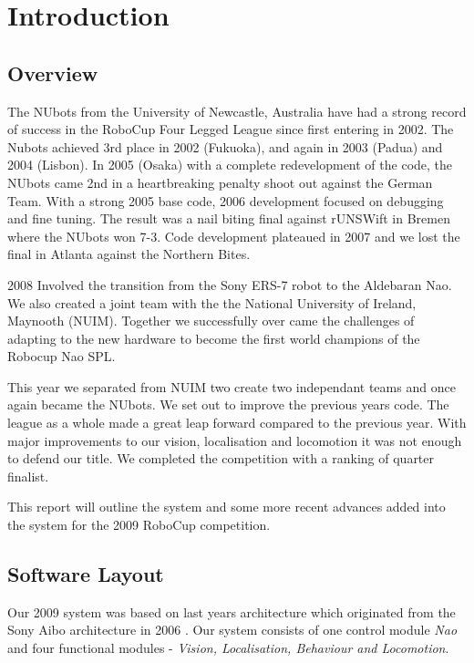 \section{Introduction}

\subsection{Overview}

The NUbots from the University of Newcastle, Australia have had a strong record of success in the RoboCup Four Legged League since first entering in 2002. The Nubots achieved 3rd place in 2002 (Fukuoka), and again in 2003 (Padua) and 2004 (Lisbon). In 2005 (Osaka) with a complete redevelopment of the code, the NUbots came 2nd in a heartbreaking penalty shoot out against the German Team. With a strong 2005 base code, 2006 development focused on debugging and fine tuning. The result was a nail biting final against rUNSWift in Bremen where the NUbots won 7-3. Code development plateaued in 2007 and we lost the final in Atlanta against the Northern Bites.  

2008 Involved the transition from the Sony ERS-7 robot to the Aldebaran Nao. We also created a joint team with the the National University of Ireland, Maynooth (NUIM). Together we successfully over came the challenges of adapting to the new hardware to become the first world champions of the Robocup Nao SPL.

This year we separated from NUIM two create two independant teams and once again became the NUbots. We set out to improve the previous years code. The league as a whole made a great leap forward compared to the previous year. With major improvements to our vision, localisation and locomotion it was not enough to defend our title. We completed the competition with a ranking of quarter finalist.

This report will outline the system and some more recent advances added into the system for the 2009 RoboCup competition.

\subsection{Software Layout}

Our 2009 system was based on last years architecture \cite{NUManoids2008}which originated from the Sony Aibo architecture in 2006 \cite{NUBOT2006}. Our system consists of one control module \emph{Nao} and four functional modules -
\emph{Vision, Localisation, Behaviour and Locomotion}. 

